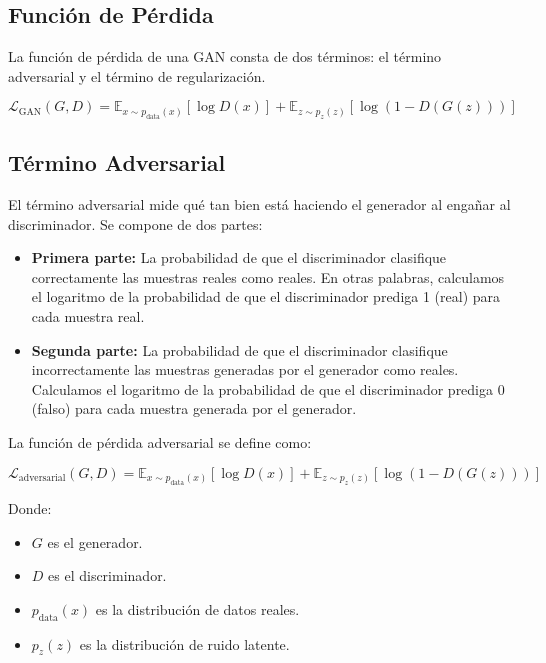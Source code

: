 \subsection{Función de Pérdida}

La función de pérdida de una GAN consta de dos términos: el término adversarial y el término de regularización.

\begin{equation}
    \mathcal{L}_{\text{GAN}}(G, D) = \mathbb{E}_{x \sim p_{\text{data}}(x)}[\log D(x)] + \mathbb{E}_{z \sim p_z(z)}[\log(1 - D(G(z)))]
\end{equation}

\subsection{Término Adversarial}

El término adversarial mide qué tan bien está haciendo el generador al engañar al discriminador. Se compone de dos partes:

\begin{itemize}
    \item \textbf{Primera parte:} La probabilidad de que el discriminador clasifique correctamente las muestras reales como reales. En otras palabras, calculamos el logaritmo de la probabilidad de que el discriminador prediga 1 (real) para cada muestra real.
    
    \item \textbf{Segunda parte:} La probabilidad de que el discriminador clasifique incorrectamente las muestras generadas por el generador como reales. Calculamos el logaritmo de la probabilidad de que el discriminador prediga 0 (falso) para cada muestra generada por el generador.
\end{itemize}

La función de pérdida adversarial se define como:

\begin{equation}
    \mathcal{L}_{\text{adversarial}}(G, D) = \mathbb{E}_{x \sim p_{\text{data}}(x)}[\log D(x)] + \mathbb{E}_{z \sim p_z(z)}[\log(1 - D(G(z)))]
\end{equation}

Donde:
\begin{itemize}
    \item \(G\) es el generador.
    \item \(D\) es el discriminador.
    \item \(p_{\text{data}}(x)\) es la distribución de datos reales.
    \item \(p_z(z)\) es la distribución de ruido latente.
\end{itemize}


